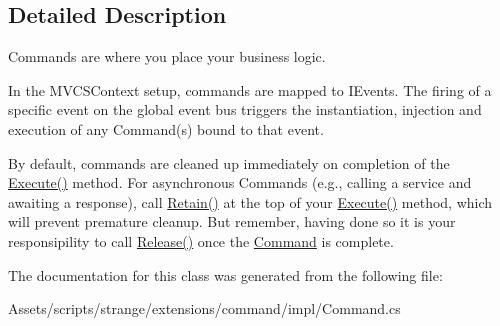\subsection{Detailed Description}
Commands are where you place your business logic. 

In the M\-V\-C\-S\-Context setup, commands are mapped to I\-Events. The firing of a specific event on the global event bus triggers the instantiation, injection and execution of any Command(s) bound to that event.

By default, commands are cleaned up immediately on completion of the {\ttfamily \hyperlink{classstrange_1_1extensions_1_1command_1_1impl_1_1_command_a4a1155270428842c342482c6885b2652}{Execute()}} method. For asynchronous Commands (e.\-g., calling a service and awaiting a response), call {\ttfamily \hyperlink{classstrange_1_1extensions_1_1command_1_1impl_1_1_command_a1525def9650d4b6ed6ed6cef2936d892}{Retain()}} at the top of your {\ttfamily \hyperlink{classstrange_1_1extensions_1_1command_1_1impl_1_1_command_a4a1155270428842c342482c6885b2652}{Execute()}} method, which will prevent premature cleanup. But remember, having done so it is your responsipility to call {\ttfamily \hyperlink{classstrange_1_1extensions_1_1command_1_1impl_1_1_command_a783b532e62f1c5c7789ae1a5791c75c7}{Release()}} once the \hyperlink{classstrange_1_1extensions_1_1command_1_1impl_1_1_command}{Command} is complete. 

The documentation for this class was generated from the following file\-:\begin{DoxyCompactItemize}
\item 
Assets/scripts/strange/extensions/command/impl/Command.\-cs\end{DoxyCompactItemize}
